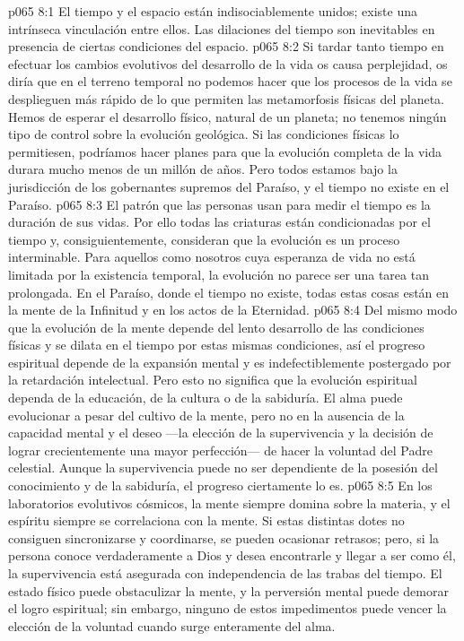 \vs p065 8:1 El tiempo y el espacio están indisociablemente unidos; existe una intrínseca vinculación entre ellos. Las dilaciones del tiempo son inevitables en presencia de ciertas condiciones del espacio.
\vs p065 8:2 Si tardar tanto tiempo en efectuar los cambios evolutivos del desarrollo de la vida os causa perplejidad, os diría que en el terreno temporal no podemos hacer que los procesos de la vida se desplieguen más rápido de lo que permiten las metamorfosis físicas del planeta. Hemos de esperar el desarrollo físico, natural de un planeta; no tenemos ningún tipo de control sobre la evolución geológica. Si las condiciones físicas lo permitiesen, podríamos hacer planes para que la evolución completa de la vida durara mucho menos de un millón de años. Pero todos estamos bajo la jurisdicción de los gobernantes supremos del Paraíso, y el tiempo no existe en el Paraíso.
\vs p065 8:3 El patrón que las personas usan para medir el tiempo es la duración de sus vidas. Por ello todas las criaturas están condicionadas por el tiempo y, consiguientemente, consideran que la evolución es un proceso interminable. Para aquellos como nosotros cuya esperanza de vida no está limitada por la existencia temporal, la evolución no parece ser una tarea tan prolongada. En el Paraíso, donde el tiempo no existe, todas estas cosas están  en la mente de la Infinitud y en los actos de la Eternidad.
\vs p065 8:4 Del mismo modo que la evolución de la mente depende del lento desarrollo de las condiciones físicas y se dilata en el tiempo por estas mismas condiciones, así el progreso espiritual depende de la expansión mental y es indefectiblemente postergado por la retardación intelectual. Pero esto no significa que la evolución espiritual dependa de la educación, de la cultura o de la sabiduría. El alma puede evolucionar a pesar del cultivo de la mente, pero no en la ausencia de la capacidad mental y el deseo ---la elección de la supervivencia y la decisión de lograr crecientemente una mayor perfección--- de hacer la voluntad del Padre celestial. Aunque la supervivencia puede no ser dependiente de la posesión del conocimiento y de la sabiduría, el progreso ciertamente lo es.
\vs p065 8:5 \pc En los laboratorios evolutivos cósmicos, la mente siempre domina sobre la materia, y el espíritu siempre se correlaciona con la mente. Si estas distintas dotes no consiguen sincronizarse y coordinarse, se pueden ocasionar retrasos; pero, si la persona conoce verdaderamente a Dios y desea encontrarle y llegar a ser como él, la supervivencia está asegurada con independencia de las trabas del tiempo. El estado físico puede obstaculizar la mente, y la perversión mental puede demorar el logro espiritual; sin embargo, ninguno de estos impedimentos puede vencer la elección de la voluntad cuando surge enteramente del alma.
